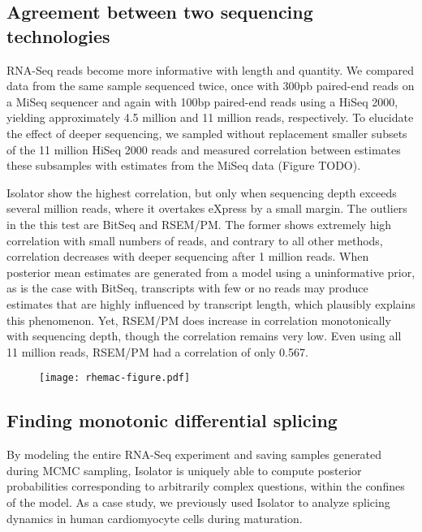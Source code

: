 \documentclass[twocolumn]{article}
\begin{document}
\subsection{Agreement between two sequencing
technologies}\label{agreement-between-two-sequencing-technologies}

RNA-Seq reads become more informative with length and quantity. We
compared data from the same sample sequenced twice, once with 300pb
paired-end reads on a MiSeq sequencer and again with 100bp paired-end
reads using a HiSeq 2000, yielding approximately 4.5 million and 11
million reads, respectively. To elucidate the effect of deeper
sequencing, we sampled without replacement smaller subsets of the 11
million HiSeq 2000 reads and measured correlation between estimates
these subsamples with estimates from the MiSeq data (Figure TODO).

Isolator show the highest correlation, but only when sequencing depth
exceeds several million reads, where it overtakes eXpress by a small
margin. The outliers in the this test are BitSeq and RSEM/PM. The former
shows extremely high correlation with small numbers of reads, and
contrary to all other methods, correlation decreases with deeper
sequencing after 1 million reads. When posterior mean estimates are
generated from a model using a uninformative prior, as is the case with
BitSeq, transcripts with few or no reads may produce estimates that are
highly influenced by transcript length, which plausibly explains this
phenomenon. Yet, RSEM/PM does increase in correlation monotonically with
sequencing depth, though the correlation remains very low. Even using
all 11 million reads, RSEM/PM had a correlation of only 0.567.

\begin{figure}
\texttt{[image: rhemac-figure.pdf]}
\end{figure}

\subsection{Finding monotonic differential
splicing}\label{finding-monotonic-differential-splicing}

By modeling the entire RNA-Seq experiment and saving samples generated
during MCMC sampling, Isolator is uniquely able to compute posterior
probabilities corresponding to arbitrarily complex questions, within the
confines of the model. As a case study, we previously used Isolator to
analyze splicing dynamics in human cardiomyocyte cells during
maturation.
\end{document}
